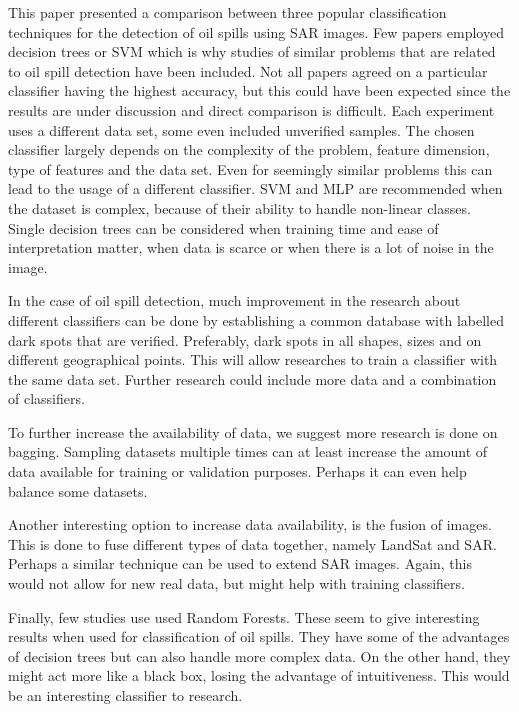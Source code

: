This paper presented a comparison between three popular classification techniques for the detection of oil spills using SAR images. Few papers employed decision trees or SVM which is why studies of similar problems that are related to oil spill detection have been included. Not all papers agreed on a particular classifier having the highest accuracy, but this could have been expected since the results are under discussion and direct comparison is difficult. Each experiment uses a different data set, some even included unverified samples. The chosen classifier largely depends on the complexity of the problem, feature dimension, type of features and the data set. Even for seemingly similar problems this can lead to the usage of a different classifier. SVM and MLP are recommended when the dataset is complex, because of their ability to handle non-linear classes. Single decision trees can be considered when training time and ease of interpretation matter, when data is scarce or when there is a lot of noise in the image. 

In the case of oil spill detection, much improvement in the research about different classifiers can be done by establishing a common database with labelled dark spots that are verified. Preferably, dark spots in all shapes, sizes and on different geographical points. This will allow researches to train a classifier with the same data set. Further research could include more data and a combination of classifiers.

To further increase the availability of data, we suggest more research is done on bagging. Sampling datasets multiple times can at least increase the amount of data available for training or validation purposes. Perhaps it can even help balance some datasets.

Another interesting option to increase data availability, is the fusion of images. This is done to fuse different types of data together, namely LandSat and SAR. Perhaps a similar technique can be used to extend SAR images. Again, this would not allow for new real data, but might help with training classifiers.

Finally, few studies use used Random Forests. These seem to give interesting results when used for classification of oil spills. They have some of the advantages of decision trees but can also handle more complex data. On the other hand, they might act more like a black box, losing the advantage of intuitiveness. This would be an interesting classifier to research.